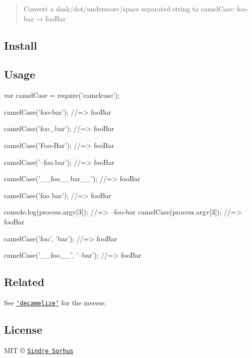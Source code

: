 \begin{quote}
Convert a dash/dot/underscore/space separated string to camel\+Case\+: {\ttfamily foo-\/bar} → {\ttfamily foo\+Bar} \end{quote}


\subsection*{Install}




\subsection*{Usage}


\begin{DoxyCode}
var camelCase = require(\textcolor{stringliteral}{'camelcase'});

camelCase(\textcolor{stringliteral}{'foo-bar'});
\textcolor{comment}{//=> fooBar}

camelCase(\textcolor{stringliteral}{'foo\_bar'});
\textcolor{comment}{//=> fooBar}

camelCase(\textcolor{stringliteral}{'Foo-Bar'});
\textcolor{comment}{//=> fooBar}

camelCase(\textcolor{stringliteral}{'--foo.bar'});
\textcolor{comment}{//=> fooBar}

camelCase(\textcolor{stringliteral}{'\_\_foo\_\_bar\_\_'});
\textcolor{comment}{//=> fooBar}

camelCase(\textcolor{stringliteral}{'foo bar'});
\textcolor{comment}{//=> fooBar}

console.log(process.argv[3]);
\textcolor{comment}{//=> --foo-bar}
camelCase(process.argv[3]);
\textcolor{comment}{//=> fooBar}

camelCase(\textcolor{stringliteral}{'foo'}, \textcolor{stringliteral}{'bar'});
\textcolor{comment}{//=> fooBar}

camelCase(\textcolor{stringliteral}{'\_\_foo\_\_'}, \textcolor{stringliteral}{'--bar'});
\textcolor{comment}{//=> fooBar}
\end{DoxyCode}


\subsection*{Related}

See \href{https://github.com/sindresorhus/decamelize}{\tt `decamelize`} for the inverse.

\subsection*{License}

M\+I\+T © \href{http://sindresorhus.com}{\tt Sindre Sorhus} 